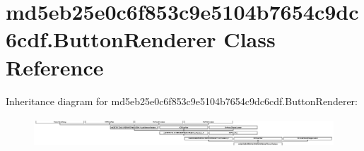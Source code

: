 \hypertarget{classmd5eb25e0c6f853c9e5104b7654c9dc6cdf_1_1ButtonRenderer}{}\section{md5eb25e0c6f853c9e5104b7654c9dc6cdf.\+Button\+Renderer Class Reference}
\label{classmd5eb25e0c6f853c9e5104b7654c9dc6cdf_1_1ButtonRenderer}
Inheritance diagram for md5eb25e0c6f853c9e5104b7654c9dc6cdf.\+Button\+Renderer\+:\begin{figure}[H]
\begin{center}
\leavevmode
\includegraphics[height=1.143791cm]{classmd5eb25e0c6f853c9e5104b7654c9dc6cdf_1_1ButtonRenderer}
\end{center}
\end{figure}
